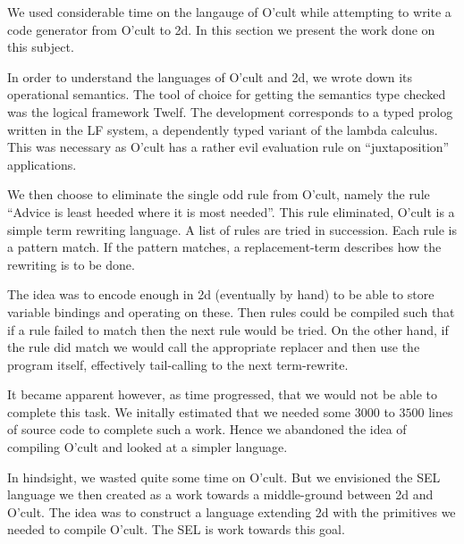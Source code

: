 
We used considerable time on the langauge of O'cult while attempting
to write a code generator from O'cult to 2d. In this section we
present the work done on this subject.

In order to understand the languages of O'cult and 2d, we wrote down
its operational semantics. The tool of choice for getting the
semantics type checked was the logical framework Twelf. The
development corresponds to a typed prolog written in the LF system, a
dependently typed variant of the lambda calculus. This was necessary
as O'cult has a rather evil evaluation rule on ``juxtaposition''
applications.

We then choose to eliminate the single odd rule from O'cult, namely
the rule ``Advice is least heeded where it is most needed''. This rule
eliminated, O'cult is a simple term rewriting language. A list of
rules are tried in succession. Each rule is a pattern match. If the
pattern matches, a replacement-term describes how the rewriting is to
be done.

The idea was to encode enough in 2d (eventually by hand) to be able to
store variable bindings and operating on these. Then rules could be
compiled such that if a rule failed to match then the next rule would
be tried. On the other hand, if the rule did match we would call the
appropriate replacer and then use the program itself, effectively
tail-calling to the next term-rewrite.

It became apparent however, as time progressed, that we would not be
able to complete this task. We initally estimated that we needed some
$3000$ to $3500$ lines of source code to complete such a work. Hence
we abandoned the idea of compiling O'cult and looked at a simpler
language.

In hindsight, we wasted quite some time on O'cult. But we envisioned
the SEL language we then created as a work towards a middle-ground
between 2d and O'cult. The idea was to construct a language extending
2d with the primitives we needed to compile O'cult. The SEL is work
towards this goal.

